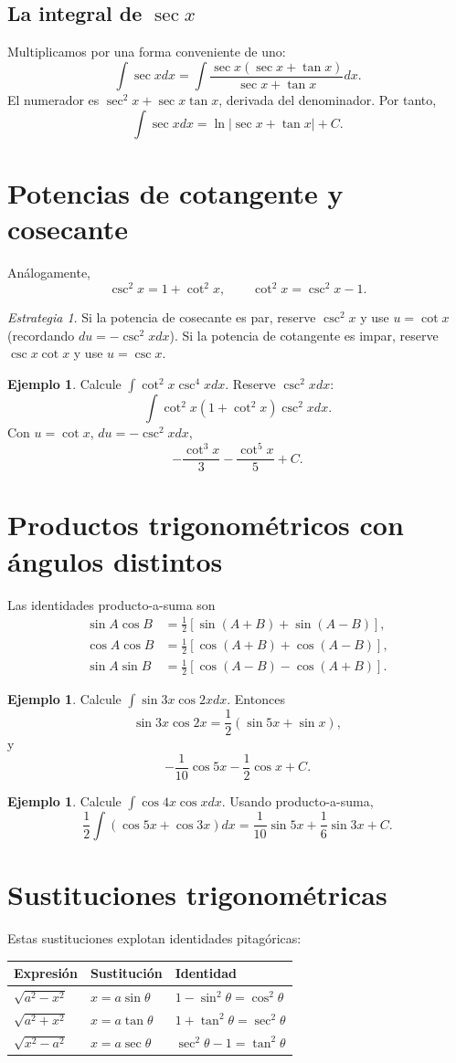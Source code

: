 \documentclass[12pt]{article}
\theoremstyle{definition}
\newtheorem{ejemplo}[teorema]{Ejemplo}
\theoremstyle{remark}
\newtheorem*{estrategia}{Estrategia}
\begin{document}
\subsection*{La integral de $\sec x$}
Multiplicamos por una forma conveniente de uno:
\[\int\sec xdx=\int\frac{\sec x(\sec x+\tan x)}{\sec x+\tan x}dx.\]
El numerador es $\sec^2x+\sec x\tan x$, derivada del denominador. Por tanto,
\[\boxed{\int\sec xdx=\ln|\sec x+\tan x|+C}.\]

\section{Potencias de cotangente y cosecante}
Análogamente,
\[\csc^2x=1+\cot^2x,\qquad\cot^2x=\csc^2x-1.\]
\begin{estrategia}Si la potencia de cosecante es par, reserve $\csc^2x$ y use $u=\cot x$ (recordando $du=-\csc^2x dx$). Si la potencia de cotangente es impar, reserve $\csc x\cot x$ y use $u=\csc x$.\end{estrategia}
\begin{ejemplo}Calcule $\int\cot^2x\csc^4x dx$. Reserve $\csc^2x dx$:
\[\int\cot^2x(1+\cot^2x)\csc^2x dx.\]
Con $u=\cot x$, $du=-\csc^2x dx$,
\[\boxed{-\frac{\cot^3x}{3}-\frac{\cot^5x}{5}+C}.\]\end{ejemplo}

\section{Productos trigonométricos con ángulos distintos}
Las identidades producto-a-suma son
\begin{align*}
\sin A\cos B&=\tfrac12[\sin(A+B)+\sin(A-B)],\\
\cos A\cos B&=\tfrac12[\cos(A+B)+\cos(A-B)],\\
\sin A\sin B&=\tfrac12[\cos(A-B)-\cos(A+B)].
\end{align*}
\begin{ejemplo}Calcule $\int\sin3x\cos2x dx$. Entonces
\[\sin3x\cos2x=\frac12(\sin5x+\sin x),\]
y
\[\boxed{-\frac1{10}\cos5x-\frac12\cos x+C}.\]\end{ejemplo}
\begin{ejemplo}Calcule $\int\cos4x\cos xdx$. Usando producto-a-suma,
\[\frac12\int(\cos5x+\cos3x)dx=\boxed{\frac1{10}\sin5x+\frac16\sin3x+C}.\]\end{ejemplo}

\section{Sustituciones trigonométricas}
Estas sustituciones explotan identidades pitagóricas:
\begin{center}\begin{tabular}{lll}\toprule
Expresión & Sustitución & Identidad\\\midrule
$\sqrt{a^2-x^2}$ & $x=a\sin\theta$ & $1-\sin^2\theta=\cos^2\theta$\\
$\sqrt{a^2+x^2}$ & $x=a\tan\theta$ & $1+\tan^2\theta=\sec^2\theta$\\
$\sqrt{x^2-a^2}$ & $x=a\sec\theta$ & $\sec^2\theta-1=\tan^2\theta$\\\bottomrule
\end{tabular}\end{center}
\end{document}
